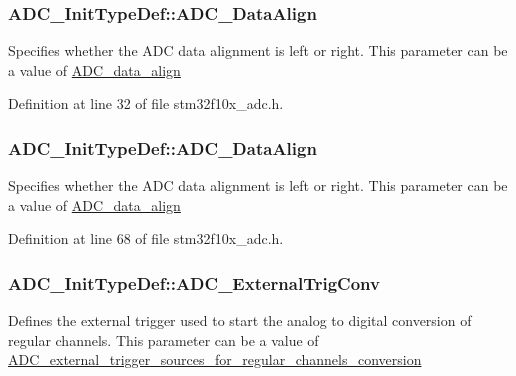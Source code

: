 \subsubsection[{\texorpdfstring{A\+D\+C\+\_\+\+Data\+Align}{ADC_DataAlign}}]{ A\+D\+C\+\_\+\+Init\+Type\+Def\+::\+A\+D\+C\+\_\+\+Data\+Align}\hypertarget{struct_a_d_c___init_type_def_ab4e268675ad296dd7b8016052d24043c}{}\label{struct_a_d_c___init_type_def_ab4e268675ad296dd7b8016052d24043c}
Specifies whether the A\+DC data alignment is left or right. This parameter can be a value of \hyperlink{group___a_d_c__data__align}{A\+D\+C\+\_\+data\+\_\+align} 

Definition at line 32 of file stm32f10x\+\_\+adc.\+h.

\subsubsection[{\texorpdfstring{A\+D\+C\+\_\+\+Data\+Align}{ADC_DataAlign}}]{ A\+D\+C\+\_\+\+Init\+Type\+Def\+::\+A\+D\+C\+\_\+\+Data\+Align}\hypertarget{struct_a_d_c___init_type_def_a622e89d8fba3900f20aaf40d5560ab7b}{}\label{struct_a_d_c___init_type_def_a622e89d8fba3900f20aaf40d5560ab7b}
Specifies whether the A\+DC data alignment is left or right. This parameter can be a value of \hyperlink{group___a_d_c__data__align}{A\+D\+C\+\_\+data\+\_\+align} 

Definition at line 68 of file stm32f10x\+\_\+adc.\+h.

\subsubsection[{\texorpdfstring{A\+D\+C\+\_\+\+External\+Trig\+Conv}{ADC_ExternalTrigConv}}]{ A\+D\+C\+\_\+\+Init\+Type\+Def\+::\+A\+D\+C\+\_\+\+External\+Trig\+Conv}\hypertarget{struct_a_d_c___init_type_def_a11c85e5c9dd59bcabaf70afb95f45db3}{}\label{struct_a_d_c___init_type_def_a11c85e5c9dd59bcabaf70afb95f45db3}
Defines the external trigger used to start the analog to digital conversion of regular channels. This parameter can be a value of \hyperlink{group___a_d_c__external__trigger__sources__for__regular__channels__conversion}{A\+D\+C\+\_\+external\+\_\+trigger\+\_\+sources\+\_\+for\+\_\+regular\+\_\+channels\+\_\+conversion} 

